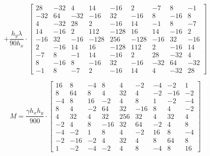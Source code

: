 \documentclass[preview]{standalone}
\begin{document}
$$
+ \frac{h_{y} \lambda}{90 h_{x}}\cdot\left[\begin{matrix}28 & -32 & 4 & 14 & -16 & 2 & -7 & 8 & -1\\-32 & 64 & -32 & -16 & 32 & -16 & 8 & -16 & 8\\4 & -32 & 28 & 2 & -16 & 14 & -1 & 8 & -7\\14 & -16 & 2 & 112 & -128 & 16 & 14 & -16 & 2\\-16 & 32 & -16 & -128 & 256 & -128 & -16 & 32 & -16\\2 & -16 & 14 & 16 & -128 & 112 & 2 & -16 & 14\\-7 & 8 & -1 & 14 & -16 & 2 & 28 & -32 & 4\\8 & -16 & 8 & -16 & 32 & -16 & -32 & 64 & -32\\-1 & 8 & -7 & 2 & -16 & 14 & 4 & -32 & 28\end{matrix}\right]
$$

$$
M = \frac{\gamma h_{x} h_{y}}{900}\cdot\left[\begin{matrix}16 & 8 & -4 & 8 & 4 & -2 & -4 & -2 & 1\\8 & 64 & 8 & 4 & 32 & 4 & -2 & -16 & -2\\-4 & 8 & 16 & -2 & 4 & 8 & 1 & -2 & -4\\8 & 4 & -2 & 64 & 32 & -16 & 8 & 4 & -2\\4 & 32 & 4 & 32 & 256 & 32 & 4 & 32 & 4\\-2 & 4 & 8 & -16 & 32 & 64 & -2 & 4 & 8\\-4 & -2 & 1 & 8 & 4 & -2 & 16 & 8 & -4\\-2 & -16 & -2 & 4 & 32 & 4 & 8 & 64 & 8\\1 & -2 & -4 & -2 & 4 & 8 & -4 & 8 & 16\end{matrix}\right]
$$
\end{document}
